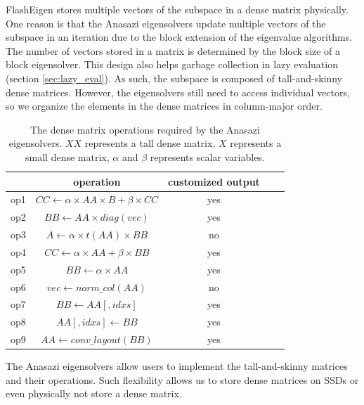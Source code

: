 FlashEigen stores multiple vectors of the subspace in a dense matrix physically.
One reason is that the Anasazi eigensolvers update multiple vectors of the subspace
in an iteration due to the block extension of the eigenvalue algorithms.
The number of vectors stored in a matrix is determined by the block size of
a block eigensolver.
This design also helps garbage collection in lazy evaluation (section \ref{sec:lazy_eval}).
As such, the subspace is composed of tall-and-skinny dense matrices.
However, the eigensolvers still need to access individual vectors,
so we organize the elements in the dense matrices in column-major order. 

\begin{table}
	\begin{center}
		\small
		\begin{tabular}{|c|c|c|c|c|}
			\hline
			& operation & customized output \\
			\hline
			op1 & $CC \leftarrow \alpha \times AA \times B + \beta \times CC$ & yes \\
			\hline
			op2 & $BB \leftarrow AA \times diag(vec)$ & yes \\
			\hline
			op3 & $A \leftarrow \alpha \times t(AA) \times BB$ & no \\
			\hline
			op4 & $CC \leftarrow \alpha \times AA + \beta \times BB$ & yes \\
			\hline
			op5 & $BB \leftarrow \alpha \times AA$ & yes \\
			\hline
			op6 & $vec \leftarrow norm\_col(AA)$ & no \\
			\hline
			op7 & $BB \leftarrow AA[,idxs]$ & yes \\
			\hline
			op8 & $AA[,idxs] \leftarrow BB$ & yes \\
			\hline
			op9 & $AA \leftarrow conv\_layout(BB)$ & yes \\
			\hline
		\end{tabular}
		\normalsize
	\end{center}
	\caption{The dense matrix operations required by the Anasazi eigensolvers.
		$XX$ represents a tall dense matrix, $X$ represents a small dense matrix,
	$\alpha$ and $\beta$ represents scalar variables.}
	\label{anasazi_ops}
\end{table}

The Anasazi eigensolvers allow users to implement
the tall-and-skinny matrices and their operations. Such flexibility allows us to
store dense matrices on SSDs or even physically not store a dense matrix.


